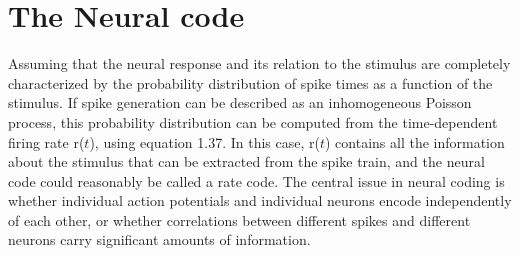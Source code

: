 \section{The Neural code}
\exm Assuming that the neural response and its relation to the stimulus are completely characterized by the probability distribution of spike times as a function of the stimulus. If spike generation can be described as an inhomogeneous Poisson process, this probability distribution can be computed from the time-dependent firing rate r($t$),  using equation 1.37. In this case, r($t$) contains all the information about the stimulus that can be extracted from the spike train, and the neural code could reasonably be called a rate code.
\rem The central issue in neural coding is whether individual action potentials and individual neurons encode independently of each other, or whether correlations between different spikes and different neurons carry significant amounts of information.
